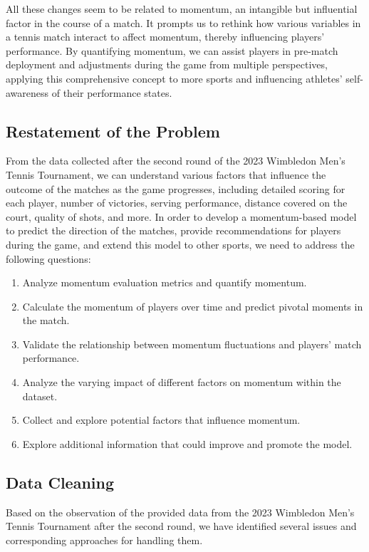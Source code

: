 \documentclass[12pt]{article}
\begin{document}
All these changes seem to be related to momentum, an intangible but influential factor in the course of a match. It prompts us to rethink how various variables in a tennis match interact to affect momentum, thereby influencing players' performance. By quantifying momentum, we can assist players in pre-match deployment and adjustments during the game from multiple perspectives, applying this comprehensive concept to more sports and influencing athletes' self-awareness of their performance states.



\subsection{Restatement of the Problem}

From the data collected after the second round of the 2023 Wimbledon Men's Tennis Tournament, we can understand various factors that influence the outcome of the matches as the game progresses, including detailed scoring for each player, number of victories, serving performance, distance covered on the court, quality of shots, and more. In order to develop a momentum-based model to predict the direction of the matches, provide recommendations for players during the game, and extend this model to other sports, we need to address the following questions:

\begin{enumerate}[\bfseries 1.]
	\item Analyze momentum evaluation metrics and quantify momentum.
	\item Calculate the momentum of players over time and predict pivotal moments in the match.
	\item Validate the relationship between momentum fluctuations and players' match performance.
	\item Analyze the varying impact of different factors on momentum within the dataset.
	\item Collect and explore potential factors that influence momentum.
	\item Explore additional information that could improve and promote the model.
\end {enumerate}

\subsection{Data Cleaning}

Based on the observation of the provided data from the 2023 Wimbledon Men's Tennis Tournament after the second round, we have identified several issues and corresponding approaches for handling them.
\end{document}
